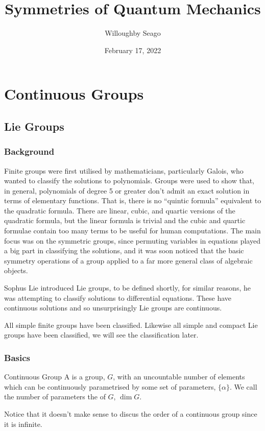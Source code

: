 \documentclass[fleqn]{NotesClass}
\title{Symmetries of Quantum Mechanics}
\author{Willoughby Seago}
\date{February 17, 2022}
\begin{document}
    \frontmatter
    \titlepage
    \tableofcontents
    \listoffigures
    \mainmatter
    
    
    
    \part{Continuous Groups}
    \chapter{Lie Groups}
    \section{Background}
    Finite groups were first utilised by mathematicians, particularly Galois, who wanted to classify the solutions to polynomials.
    Groups were used to show that, in general, polynomials of degree 5 or greater don't admit an exact solution in terms of elementary functions.
    That is, there is no \enquote{quintic formula} equivalent to the quadratic formula.
    There are linear, cubic, and quartic versions of the quadratic formula, but the linear formula is trivial and the cubic and quartic formulae contain too many terms to be useful for human computations.
    The main focus was on the symmetric groups, since permuting variables in equations played a big part in classifying the solutions, and it was soon noticed that the basic symmetry operations of a group applied to a far more general class of algebraic objects.
    
    Sophus Lie introduced Lie groups, to be defined shortly, for similar reasons, he was attempting to classify solutions to differential equations.
    These have continuous solutions and so unsurprisingly Lie groups are continuous.
    
    All simple finite groups have been classified.
    Likewise all simple and compact Lie groups have been classified, we will see the classification later.
    
    \section{Basics}
    \begin{dfn}{Continuous Group}{}
        A  is a group, \(G\), with an uncountable number of elements which can be continuously parametrised by some set of parameters, \(\{\alpha\}\).
        We call the number of parameters the  of \(G\), \(\dim G\).
    \end{dfn}
    Notice that it doesn't make sense to discus the order of a continuous group since it is infinite.
    
\end{document}
